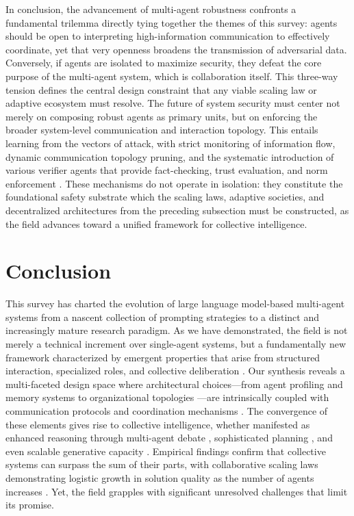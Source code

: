 \documentclass[11pt,a4paper]{article}
\begin{document}
In conclusion, the advancement of multi-agent robustness confronts a fundamental trilemma directly tying together the themes of this survey: agents should be open to interpreting high-information communication to effectively coordinate, yet that very openness broadens the transmission of adversarial data. Conversely, if agents are isolated to maximize security, they defeat the core purpose of the multi-agent system, which is collaboration itself. This three-way tension defines the central design constraint that any viable scaling law or adaptive ecosystem must resolve. The future of system security must center not merely on composing robust agents as primary units, but on enforcing the broader system-level communication and interaction topology. This entails learning from the vectors of attack, with strict monitoring of information flow, dynamic communication topology pruning, and the systematic introduction of various verifier agents that provide fact-checking, trust evaluation, and norm enforcement \cite{arxiv:2407.07791v2,arxiv:2203.08975v1}. These mechanisms do not operate in isolation: they constitute the foundational safety substrate which the scaling laws, adaptive societies, and decentralized architectures from the preceding subsection must be constructed, as the field advances toward a unified framework for collective intelligence.


\section{Conclusion}


This survey has charted the evolution of large language model-based multi-agent systems from a nascent collection of prompting strategies to a distinct and increasingly mature research paradigm. As we have demonstrated, the field is not merely a technical increment over single-agent systems, but a fundamentally new framework characterized by emergent properties that arise from structured interaction, specialized roles, and collective deliberation \cite{arxiv:2402.01680v2,arxiv:2309.07864v3,arxiv:2308.11432v5}. Our synthesis reveals a multi-faceted design space where architectural choices---from agent profiling and memory systems \cite{arxiv:2404.13501v1} to organizational topologies \cite{arxiv:2403.12482v1,arxiv:2404.02183v1}---are intrinsically coupled with communication protocols and coordination mechanisms \cite{arxiv:2005.07064v1,arxiv:1901.08441v3}. The convergence of these elements gives rise to collective intelligence, whether manifested as enhanced reasoning through multi-agent debate \cite{arxiv:2305.19118v1,arxiv:2309.13007v2}, sophisticated planning \cite{arxiv:2406.08979v1}, and even scalable generative capacity \cite{arxiv:2402.05120v1,arxiv:2406.07155v1}. Empirical findings confirm that collective systems can surpass the sum of their parts, with collaborative scaling laws demonstrating logistic growth in solution quality as the number of agents increases \cite{arxiv:2406.07155v1,arxiv:2402.05120v1}. Yet, the field grapples with significant unresolved challenges that limit its promise.
\end{document}
